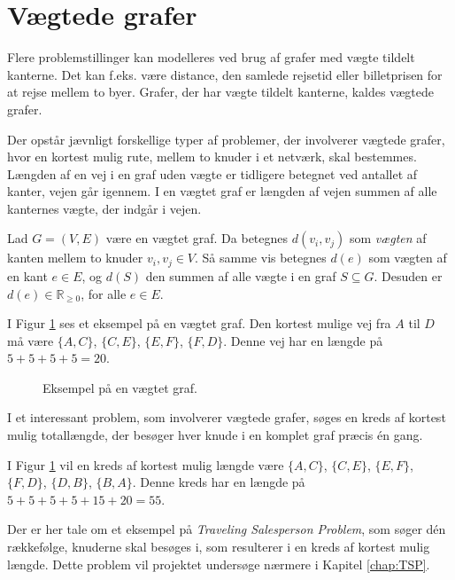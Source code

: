 \section{Vægtede grafer}

Flere problemstillinger kan modelleres ved brug af grafer med vægte tildelt kanterne. 
Det kan f.eks. være distance, den samlede rejsetid eller billetprisen for at rejse mellem to byer. 
Grafer, der har vægte tildelt kanterne, kaldes vægtede grafer. 

Der opstår jævnligt forskellige typer af problemer, der involverer vægtede grafer, hvor en kortest mulig rute, mellem to knuder i et netværk, skal bestemmes. 
Længden af en vej i en graf uden vægte er tidligere betegnet ved antallet af kanter, vejen går igennem.
I en vægtet graf er længden af vejen summen af alle kanternes vægte, der indgår i vejen.

\begin{defn}
	Lad $G = (V,E)$ være en vægtet graf. Da betegnes $d(v_i, v_j)$ som \textit{vægten} af kanten mellem to knuder $v_i, v_j \in V$.
	Så samme vis betegnes $d(e)$ som vægten af en kant $e \in E$, og $d(S)$ den summen af alle vægte i en graf $S \subseteq G$.
	Desuden er $d(e) \in \mathbb{R}_{\geq 0}$, for alle $e \in E$.
\end{defn}

\begin{exmp}
I Figur \ref{fig:weighted_graph} ses et eksempel på en vægtet graf. Den kortest mulige vej fra $A$ til $D$ må være $\lbrace A,C \rbrace$, $\lbrace C,E \rbrace$, $\lbrace E,F \rbrace$, $\lbrace F,D \rbrace$. Denne vej har en længde på $5+5+5+5=20$. 
\end{exmp}

\begin{figure}[h!]
	\centering
	
	\caption{Eksempel på en vægtet graf.} \label{fig:weighted_graph}
\end{figure}

I et interessant problem, som involverer vægtede grafer, søges en kreds af kortest mulig totallængde, der besøger hver knude i en komplet graf præcis én gang.

I Figur \ref{fig:weighted_graph} vil en kreds af kortest mulig længde være $\lbrace A,C \rbrace$, $\lbrace C,E \rbrace$, $\lbrace E,F \rbrace$, $\lbrace F,D \rbrace$, $\lbrace D,B \rbrace$, $\lbrace B,A \rbrace$.
Denne kreds har en længde på $5+5+5+5+15+20=55$.

Der er her tale om et eksempel på \emph{Traveling Salesperson Problem}, som søger dén rækkefølge, knuderne skal besøges i, som resulterer i en kreds af kortest mulig længde. 
Dette problem vil projektet undersøge nærmere i Kapitel \ref{chap:TSP}.

